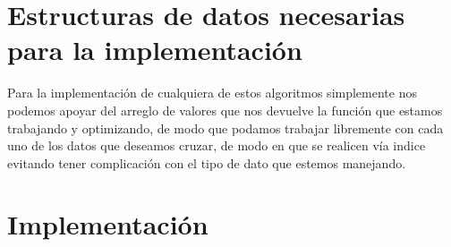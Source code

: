 \documentclass[10pt]{article}
\begin{document}
\section{Estructuras de datos necesarias para la implementación}
Para la implementación de cualquiera de estos algoritmos simplemente nos podemos apoyar del arreglo de valores que nos devuelve la función que estamos trabajando y optimizando, de modo que podamos trabajar libremente con cada uno de los datos que deseamos cruzar, de modo en que se realicen vía indice evitando tener complicación con el tipo de dato que estemos manejando.
\section{Implementación}

\end{document}
